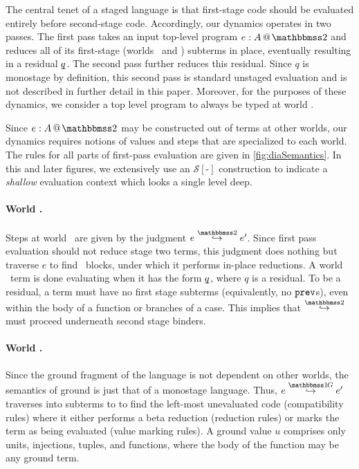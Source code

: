 
\begin{abstrsyn}
The central tenet of a staged language
is that first-stage code should be evaluated entirely before second-stage code.
Accordingly, our dynamics operates in two passes.
The first pass takes an input top-level program $\coltwo e A$
and reduces all of its first-stage (worlds \bbonem\ and \bbonep) subterms in place,
eventually resulting in a residual $\underline{\smash{q}}$.
The second pass further reduces this residual.
Since $q$ is monostage by definition, this second pass is standard unstaged evaluation
and is not described in further detail in this paper.
Moreover, for the purposes of these dynamics, we consider a top level program to always be typed at world \bbtwo.

Since $\coltwo e A$ may be constructed out of terms at other worlds, 
our dynamics requires notions of values and steps that are specialized to each world.
The rules for all parts of first-pass evaluation are given in \ref{fig:diaSemantics}.
In this and later figures, we extensively use an $\mathcal{S}[\text{-}]$ construction
to indicate a \emph{shallow} evaluation context which looks a single level deep.

\paragraph{World \bbtwo.} Steps at world \bbtwo\ are given by the judgment \mbox{$\steptwo e {e'}$}.
Since first pass evaluation should not reduce stage two terms, this judgment does nothing but traverse $e$ to find \prev\ blocks, under which it performs in-place reductions.
A world \bbtwo\ term is done evaluating when it has the form $\underline{\smash{q}}$, where $q$ is a residual. 
To be a residual, a term must have no first stage subterms (equivalently, no ${\tt prev}$s), even within the body of a function or branches of a case.
This implies that $\stepsym \bbtwo$ must proceed underneath second stage binders.

\paragraph{World \bbonep.} Since the ground fragment of the language is not dependent on other worlds, the semantics of ground is just that of a monostage language.
Thus, $\steppure e {e'}$ traverses into subterms to to find the left-most unevaluated code (compatibility rules) 
where it either performs a beta reduction (reduction rules) or marks the term as being evaluated (value marking rules). 
A ground value $u$ comprises only units, injections, tuples, and functions, where the body of the function may be any ground term.


\end{abstrsyn}
